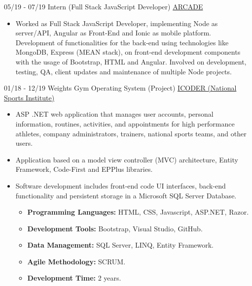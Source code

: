 \documentclass[letterpaper]{twentysecondcv} %
\begin{document}
\begin{twenty}
    \twentyitem
    	{05/19 - 07/19}
        {Intern (Full Stack JavaScript Developer)}
        { \href{https://arcader.life/}{ARCADE} }
        {
            \begin{itemize}
                \item Worked as Full Stack JavaScript Developer, implementing Node as server/API, Angular as Front-End and Ionic as mobile platform. Development of functionalities for the back-end using technologies like MongoDB, Express (MEAN stack), on front-end development components with the usage of Bootstrap, HTML and Angular. Involved on development, testing, QA, client updates and maintenance of multiple Node projects. 
            \end{itemize}
        }
        
    \twentyitem
    	{01/18 - 12/19}
        {Weights Gym Operating System (Project)}
        { \href{https://www.icoder.go.cr/}{ICODER (National Sports Institute)} }
        {
            \begin{itemize}
                \item ASP .NET web application that manages user accounts, personal information, routines, activities, and appointments for high performance athletes, company administrators, trainers, national sports teams, and other users.
                \item Application based on a model view controller (MVC) architecture, Entity Framework, Code-First and EPPlus libraries.
                \item Software development includes front-end code UI interfaces, back-end functionality and persistent storage in a Microsoft SQL Server Database.
                    \begin{itemize}
                        \item \textbf{Programming Languages:} HTML, CSS, Javascript, ASP.NET, Razor.
                        \item \textbf{Development Tools:} Bootstrap, Visual Studio, GitHub.
                        \item \textbf{Data Management:} SQL Server, LINQ, Entity Framework.
                        \item \textbf{Agile Methodology:} SCRUM.
                        \item \textbf{Development Time:} 2 years.
                \end{itemize}
            \end{itemize}
        }

\end{twenty}
\end{document}
